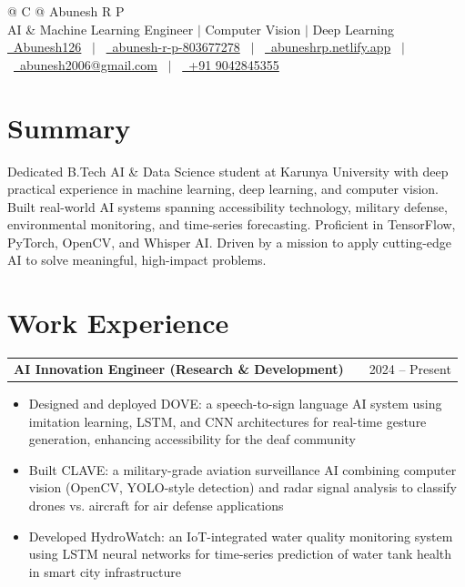 \documentclass[a4paper,12pt]{article}
\makeatletter
\newenvironment{joblong}[2]
    {
    \begin{tabularx}{\linewidth}{@{}l X r@{}}
    \textbf{#1} & \hfill & #2 \\[2pt]
    \end{tabularx}
    \begin{minipage}[t]{\linewidth}
    \begin{itemize}[nosep,after=\strut, leftmargin=1em, itemsep=2pt,label=--]
    }
    {
    \end{itemize}
    \end{minipage}
    }
\makeatother
\begin{document}
\pagestyle{empty}

\begin{tabularx}{\linewidth}{@{} C @{}}
\Huge{Abunesh R P} \\[5pt]
\normalsize{AI \& Machine Learning Engineer $|$ Computer Vision $|$ Deep Learning} \\[3pt]
\href{https://github.com/Abunesh126}{\raisebox{-0.05\height}\faGithub\ Abunesh126} \ $|$ \
\href{https://linkedin.com/in/abunesh-r-p-803677278}{\raisebox{-0.05\height}\faLinkedin\ abunesh-r-p-803677278} \ $|$ \
\href{https://abuneshrp.netlify.app}{\raisebox{-0.05\height}\faGlobe\ abuneshrp.netlify.app} \ $|$ \
\href{mailto:abunesh2006@gmail.com}{\raisebox{-0.05\height}\faEnvelope\ abunesh2006@gmail.com} \ $|$ \
\href{tel:+919042845355}{\raisebox{-0.05\height}\faMobile\ +91 9042845355} \\
\end{tabularx}

\section{Summary}
Dedicated B.Tech AI \& Data Science student at Karunya University with deep practical experience in machine learning, deep learning, and computer vision. Built real-world AI systems spanning accessibility technology, military defense, environmental monitoring, and time-series forecasting. Proficient in TensorFlow, PyTorch, OpenCV, and Whisper AI. Driven by a mission to apply cutting-edge AI to solve meaningful, high-impact problems.

\section{Work Experience}

\begin{joblong}{AI Innovation Engineer (Research \& Development)}{2024 -- Present}
\item Designed and deployed DOVE: a speech-to-sign language AI system using imitation learning, LSTM, and CNN architectures for real-time gesture generation, enhancing accessibility for the deaf community
\item Built CLAVE: a military-grade aviation surveillance AI combining computer vision (OpenCV, YOLO-style detection) and radar signal analysis to classify drones vs. aircraft for air defense applications
\item Developed HydroWatch: an IoT-integrated water quality monitoring system using LSTM neural networks for time-series prediction of water tank health in smart city infrastructure
\end{joblong}
\end{document}
